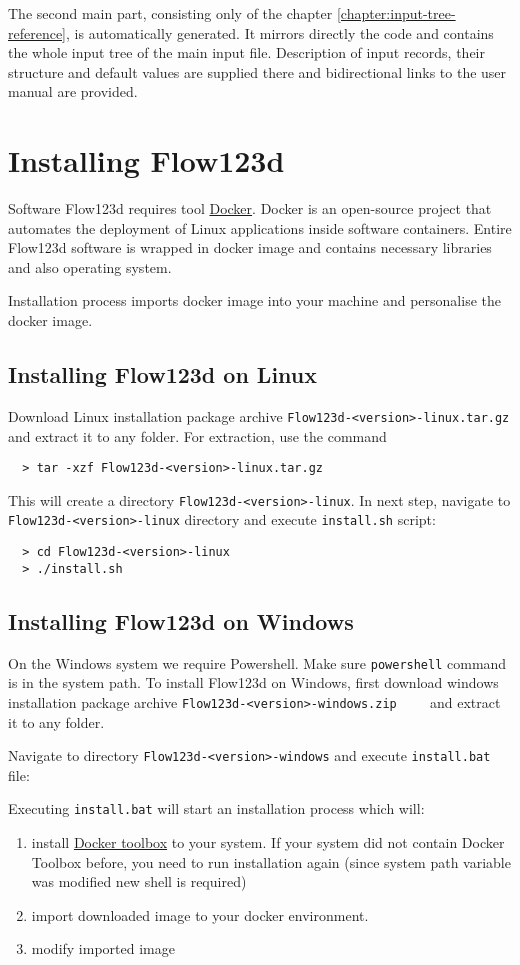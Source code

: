 \documentclass[12pt,a4paper]{report}
\begin{document}
The second main part, consisting only of the chapter \ref{chapter:input-tree-reference}, is automatically
generated. It mirrors directly the code and contains the whole input tree of the main input file. Description
of input records, their structure and default values are supplied there and bidirectional links to the user 
manual are provided.


\section{Installing Flow123d}
Software Flow123d requires tool \href{https://www.docker.com}{Docker}. Docker is an open-source project that automates the deployment of Linux applications inside software containers. Entire Flow123d software is wrapped in docker image and contains necessary libraries and also operating system.

Installation process imports docker image into your machine and personalise the docker image.

\subsection{Installing Flow123d on Linux}
Download Linux installation package archive \verb'Flow123d-<version>-linux.tar.gz' and extract it to any folder.
For extraction, use the command
\begin{verbatim}
  > tar -xzf Flow123d-<version>-linux.tar.gz 
\end{verbatim}
This will create a directory \verb'Flow123d-<version>-linux'. In next step, navigate to \verb'Flow123d-<version>-linux' directory
and execute \verb'install.sh' script:
\begin{verbatim}
  > cd Flow123d-<version>-linux
  > ./install.sh
\end{verbatim}


\subsection{Installing Flow123d on Windows}
On the Windows system we require Powershell. Make sure \verb'powershell' command is in the system path. To install Flow123d on Windows,
first download windows installation package archive \verb'Flow123d-<version>-windows.zip	' and extract it to any folder.

Navigate to directory \verb'Flow123d-<version>-windows' and execute \verb'install.bat' file:

Executing \verb'install.bat' will start an installation process which will:
\begin{enumerate}
	\item install \href{https://www.docker.com/products/docker-toolbox}{Docker toolbox} to your system.
	If your system did not contain Docker Toolbox before, you need to run installation again (since system path variable was modified new shell is required)
	\item import downloaded image to your docker environment.
	\item modify imported image
\end{enumerate}
\end{document}
